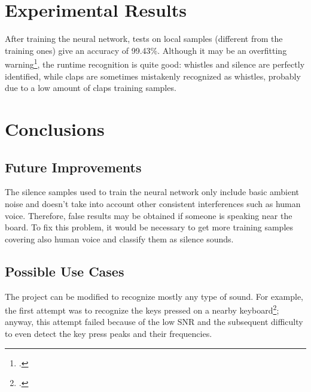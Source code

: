 \documentclass[12pt]{article}
\begin{document}
\section{Experimental Results}
After training the neural network, tests on local samples (different from the training ones) give an accuracy of 99.43\%. Although it may be an overfitting warning\footcite{coppin2004artificial}, the runtime recognition is quite good: whistles and silence are perfectly identified, while claps are sometimes mistakenly recognized as whistles, probably due to a low amount of claps training samples.\\

\section{Conclusions}

\subsection{Future Improvements}
The silence samples used to train the neural network only include basic ambient noise and doesn't take into account other consistent interferences such as human voice. Therefore, false results may be obtained if someone is speaking near the board. To fix this problem, it would be necessary to get more training samples covering also human voice and classify them as silence sounds.

\subsection{Possible Use Cases}
The project can be modified to recognize mostly any type of sound. For example, the first attempt was to recognize the keys pressed on a nearby keyboard\footcite{jakobsson2006phishing}; anyway, this attempt failed because of the low SNR and the subsequent difficulty to even detect the key press peaks and their frequencies.
\end{document}
